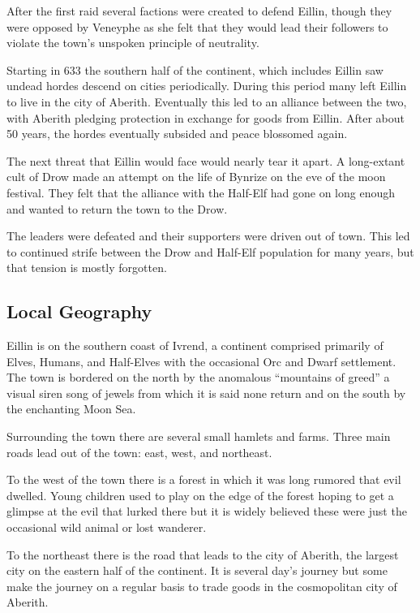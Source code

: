 \documentclass[smalldemyvopaper,11pt,twoside,onecolumn,openright,extrafontsizes]{memoir}
\begin{document}
After the first raid several factions were created to defend Eillin,
though they were opposed by Veneyphe as she felt that they would lead
their followers to violate the town's unspoken principle of neutrality.

Starting in 633 the southern half of the continent, which includes
Eillin saw undead hordes descend on cities periodically. During this
period many left Eillin to live in the city of Aberith. Eventually this
led to an alliance between the two, with Aberith pledging protection in
exchange for goods from Eillin. After about 50 years, the hordes
eventually subsided and peace blossomed again.

The next threat that Eillin would face would nearly tear it apart. A
long-extant cult of Drow made an attempt on the life of Bynrize on the
eve of the moon festival. They felt that the alliance with the Half-Elf
had gone on long enough and wanted to return the town to the Drow.

The leaders were defeated and their supporters were driven out of town.
This led to continued strife between the Drow and Half-Elf population
for many years, but that tension is mostly forgotten.

\hypertarget{local-geography}{%
\subsection{Local Geography}\label{local-geography}}

Eillin is on the southern coast of Ivrend, a continent comprised
primarily of Elves, Humans, and Half-Elves with the occasional Orc and
Dwarf settlement. The town is bordered on the north by the anomalous
``mountains of greed'' a visual siren song of jewels from which it is
said none return and on the south by the enchanting Moon Sea.

Surrounding the town there are several small hamlets and farms. Three
main roads lead out of the town: east, west, and northeast.

To the west of the town there is a forest in which it was long rumored
that evil dwelled. Young children used to play on the edge of the forest
hoping to get a glimpse at the evil that lurked there but it is widely
believed these were just the occasional wild animal or lost wanderer.

To the northeast there is the road that leads to the city of Aberith,
the largest city on the eastern half of the continent. It is several
day's journey but some make the journey on a regular basis to trade
goods in the cosmopolitan city of Aberith.
\end{document}
